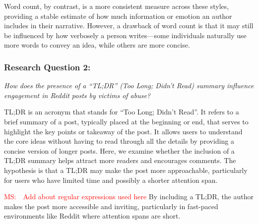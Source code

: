 \documentclass[11pt]{article}
\newcommand{\ms}[1]{\textcolor{red}{{MS:~~#1}}}
\begin{document}
Word count, by contrast, is a more consistent measure across these styles, providing a stable estimate of how much information or emotion an author includes in their narrative.
However, a drawback of word count is that it may still be influenced by how verbosely a person writes—some individuals naturally use more words to convey an idea, while others are more concise.

\subsubsection{Research Question 2:} 

\textit{How does the presence of a ``TL;DR'' (Too Long; Didn't Read) summary influence engagement in Reddit posts by victims of abuse?} 

TL;DR is an acronym that stands for ``Too Long; Didn't Read''. 
It refers to a brief summary of a post, typically placed at the beginning or end, that serves to highlight the key points or takeaway of the post. 
It allows users to understand the core ideas without having to read through all the details by providing a concise version of longer posts. Here, we examine whether the inclusion of a TL;DR summary helps attract more readers and encourages comments. 
The hypothesis is that a TL;DR may make the post more approachable, particularly for users who have limited time and possibly a shorter attention span. 


\ms{Add about regular expressions used here}
By including a TL;DR, the author makes the post more accessible and inviting, particularly in fast-paced environments like Reddit where attention spans are short.
\end{document}
